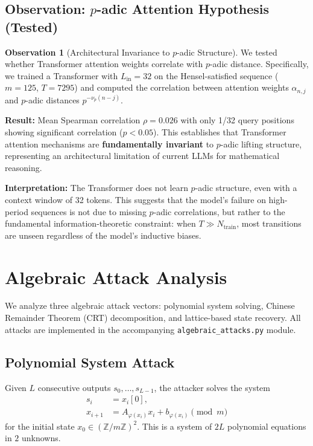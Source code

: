 \documentclass[11pt]{article}
\theoremstyle{plain}
\theoremstyle{definition}
\newtheorem{observation}[theorem]{Observation}
\newcommand{\Z}{\mathbb{Z}}
\newcommand{\vp}{\nu_p}
\begin{document}
\subsection{Observation: $p$-adic Attention Hypothesis (Tested)}

\begin{observation}[Architectural Invariance to $p$-adic Structure]
\label{obs:padic}
We tested whether Transformer attention weights correlate with $p$-adic distance. Specifically, we trained a Transformer with $L_{\mathrm{in}}=32$ on the Hensel-satisfied sequence ($m=125$, $T=7295$) and computed the correlation between attention weights $\alpha_{n,j}$ and $p$-adic distances $p^{-\vp(n-j)}$.

\textbf{Result:} Mean Spearman correlation $\rho = 0.026$ with only 1/32 query positions showing significant correlation ($p < 0.05$). This establishes that Transformer attention mechanisms are \textbf{fundamentally invariant} to $p$-adic lifting structure, representing an architectural limitation of current LLMs for mathematical reasoning.

\textbf{Interpretation:} The Transformer does not learn $p$-adic structure, even with a context window of 32 tokens. This suggests that the model's failure on high-period sequences is not due to missing $p$-adic correlations, but rather to the fundamental information-theoretic constraint: when $T \gg N_{\mathrm{train}}$, most transitions are unseen regardless of the model's inductive biases.
\end{observation}

\section{Algebraic Attack Analysis}
\label{sec:algebraic}

We analyze three algebraic attack vectors: polynomial system solving, Chinese Remainder Theorem (CRT) decomposition, and lattice-based state recovery. All attacks are implemented in the accompanying \texttt{algebraic\_attacks.py} module.

\subsection{Polynomial System Attack}

Given $L$ consecutive outputs $s_0, \ldots, s_{L-1}$, the attacker solves the system
\begin{align}
  s_i &= x_i[0], \\
  x_{i+1} &= A_{\varphi(x_i)} x_i + b_{\varphi(x_i)} \pmod{m}
\end{align}
for the initial state $x_0 \in (\Z/m\Z)^2$. This is a system of $2L$ polynomial equations in $2$ unknowns.
\end{document}

